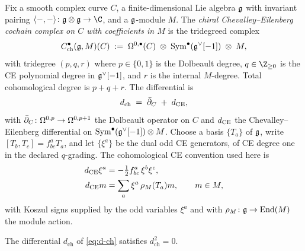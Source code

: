 \begin{definition}
\label{def:ch-ce-cochains}
%
Fix a smooth complex curve $C$, a finite-dimensional Lie algebra
$\mathfrak{g}$ with invariant pairing $\langle-,-\rangle\colon\fg\otimes\fg\to\C$,
and a $\mathfrak{g}$-module $M$. The \emph{chiral Chevalley--Eilenberg cochain
complex on $C$ with coefficients in $M$} is the tridegreed complex
\begin{equation}
\label{eq:ch-ce-cochains-def}
C^\bullet_{\mathrm{ch}}(\mathfrak{g}, M)(C)
\;:=\;
\Omega^{0,\bullet}(C)
\;\otimes\;
\mathrm{Sym}^\bullet(\mathfrak{g}^\vee[-1])
\;\otimes\;
M,
\end{equation}
with tridegree $(p,q,r)$ where $p\in\{0,1\}$ is the Dolbeault degree,
$q\in\Z_{\ge 0}$ is the CE polynomial degree in $\mathfrak{g}^\vee[-1]$, and
$r$ is the internal $M$-degree. Total cohomological degree is
$p+q+r$. The differential is
\begin{equation}
\label{eq:d-ch}
d_{\mathrm{ch}}
\;=\;
\bar\partial_C \;+\; d_{\mathrm{CE}},
\end{equation}
with $\bar\partial_C\colon\Omega^{0,p}\to\Omega^{0,p+1}$ the Dolbeault
operator on $C$ and $d_{\mathrm{CE}}$ the Chevalley--Eilenberg differential
on $\mathrm{Sym}^\bullet(\mathfrak{g}^\vee[-1])\otimes M$. Choose a basis
$\{T_a\}$ of $\mathfrak{g}$, write $[T_b,T_c]=f^a_{bc}T_a$, and let
$\{\xi^a\}$ be the dual odd CE generators, of CE degree one in the
declared $q$-grading. The cohomological CE convention used here is
\begin{align}
\label{eq:d-CE-generator}
d_{\mathrm{CE}}\xi^a
&=
-\tfrac12 f^a_{bc}\,\xi^b\xi^c,\\
\label{eq:d-CE-module}
d_{\mathrm{CE}}m
&=
\sum_a \xi^a\,\rho_M(T_a)m,
\qquad m\in M,
\end{align}
with Koszul signs supplied by the odd variables $\xi^a$ and with
$\rho_M\colon\mathfrak{g}\to\mathrm{End}(M)$ the module action.
\end{definition}

\begin{proposition}
\label{prop:ch-ce-nilpotency}
%
The differential $d_{\mathrm{ch}}$ of \eqref{eq:d-ch} satisfies
$d_{\mathrm{ch}}^2 = 0$.
\end{proposition}

